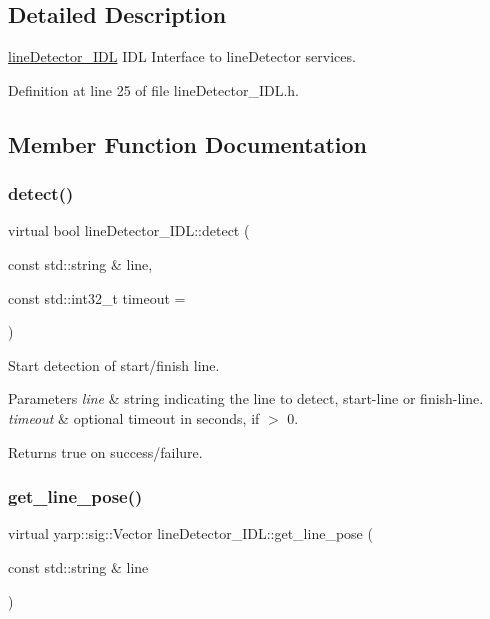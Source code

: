 \subsection{Detailed Description}
\hyperlink{classlineDetector__IDL}{line\+Detector\+\_\+\+I\+DL} I\+DL Interface to line\+Detector services. 

Definition at line 25 of file line\+Detector\+\_\+\+I\+D\+L.\+h.



\subsection{Member Function Documentation}
\mbox{\label{classlineDetector__IDL_a393124f2e4ea02a0ef2d4ba4df5d73c0}} 
\subsubsection{\texorpdfstring{detect()}{detect()}}
{\footnotesize\ttfamily virtual bool line\+Detector\+\_\+\+I\+D\+L\+::detect (\begin{DoxyParamCaption}\item[{const std\+::string \&}]{line,  }\item[{const std\+::int32\+\_\+t}]{timeout = {} }\end{DoxyParamCaption})\hspace{0.3cm}{\ttfamily [virtual]}}



Start detection of start/finish line. 


\begin{DoxyParams}{Parameters}
{\em line} & string indicating the line to detect, start-\/line or finish-\/line. \\
\hline
{\em timeout} & optional timeout in seconds, if $>$ 0. \\
\hline
\end{DoxyParams}
\begin{DoxyReturn}{Returns}
true on success/failure. 
\end{DoxyReturn}
\mbox{\label{classlineDetector__IDL_a6684bf72680108e8b5db2a6b48e6e504}} 
\subsubsection{\texorpdfstring{get\+\_\+line\+\_\+pose()}{get\_line\_pose()}}
{\footnotesize\ttfamily virtual yarp\+::sig\+::\+Vector line\+Detector\+\_\+\+I\+D\+L\+::get\+\_\+line\+\_\+pose (\begin{DoxyParamCaption}\item[{const std\+::string \&}]{line }\end{DoxyParamCaption})\hspace{0.3cm}{\ttfamily [virtual]}}



